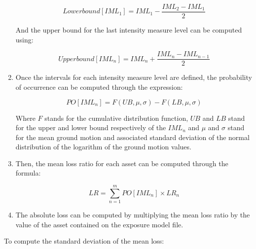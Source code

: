 \begin{enumerate}
\begin{equation}
Lower bound[IML_1]= IML_1-\frac{IML_2-IML_{1}}{2}
\end{equation}

And the upper bound for the last intensity measure level can be computed using:

\begin{equation}
Upper bound[IML_{n}]  = IML_{n}+\frac{IML_{n}-IML_{n-1}}{2}
\end{equation}

\item Once the intervals for each intensity measure level are defined, the probability of occurrence can be computed through the expression:

\begin{equation}
PO[IML_{n}]  = F(UB,\mu,\sigma)-F(LB,\mu,\sigma)
\end{equation}

Where $F$ stands for the cumulative distribution function, $UB$ and $LB$ stand for the upper and lower bound respectively of the $IML_n$ and $\mu$ and $\sigma$ stand for the mean ground motion and associated standard deviation of the normal distribution of the logarithm of the ground motion values.

\item Then, the mean loss ratio for each asset can be computed through the formula:

\begin{equation}
LR  = \sum_{n=1}^mPO[IML_n] \times LR_n
\end{equation}

\item The absolute loss can be computed by multiplying the mean loss ratio by the value of the asset contained on the exposure model file.

\end{enumerate}

To compute the standard deviation of the mean loss:

